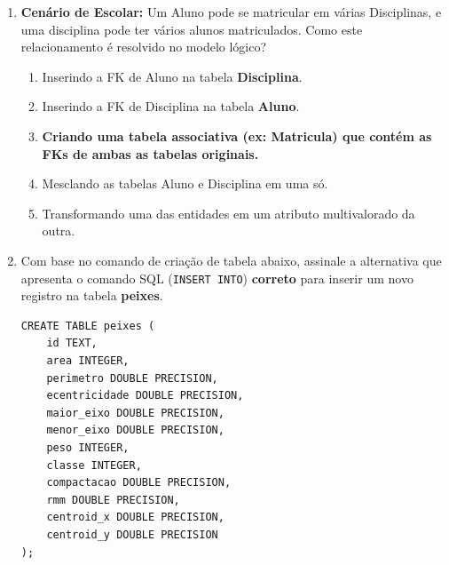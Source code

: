 \documentclass[12pt,a4paper]{article}
\begin{document}
\begin{enumerate}
\begin{center}
    \end{center}

\noindent
\begin{lstlisting}
CREATE TABLE MEDICO (
    id SERIAL PRIMARY KEY,
    crm VARCHAR(20) UNIQUE NOT NULL,
    nome VARCHAR(100) NOT NULL,
    especialidade VARCHAR(50)
);
\end{lstlisting}

    \item \textbf{Cenário de Escolar:} Um Aluno pode se matricular em várias Disciplinas, e uma disciplina pode ter vários alunos matriculados. Como este relacionamento é resolvido no modelo lógico?
    \begin{enumerate}[label=\Alph*)]
        \item Inserindo a FK de Aluno na tabela \textbf{Disciplina}.
        \item Inserindo a FK de Disciplina na tabela \textbf{Aluno}.
        \item \textbf{Criando uma tabela associativa (ex: Matricula) que contém as FKs de ambas as tabelas originais.}
        \item Mesclando as tabelas Aluno e Disciplina em uma só.
        \item Transformando uma das entidades em um atributo multivalorado da outra.
    \end{enumerate}

 \item Com base no comando de criação de tabela abaixo, assinale a alternativa que apresenta o comando SQL (\texttt{INSERT INTO}) \textbf{correto} para inserir um novo registro na tabela \textbf{peixes}.

\begin{verbatim}
CREATE TABLE peixes (
    id TEXT,
    area INTEGER,
    perimetro DOUBLE PRECISION,
    ecentricidade DOUBLE PRECISION,
    maior_eixo DOUBLE PRECISION,
    menor_eixo DOUBLE PRECISION,
    peso INTEGER,
    classe INTEGER,
    compactacao DOUBLE PRECISION,
    rmm DOUBLE PRECISION,
    centroid_x DOUBLE PRECISION,
    centroid_y DOUBLE PRECISION
);
\end{verbatim}


\end{enumerate}
\end{document}
